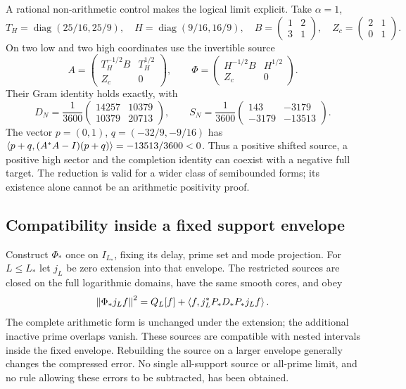 A rational non-arithmetic control makes the logical limit explicit.
Take $\alpha=1$,
\[
T_H=\operatorname{diag}(25/16,25/9),\quad
H=\operatorname{diag}(9/16,16/9),\quad
B=\begin{pmatrix}1&2\\3&1\end{pmatrix},\quad
Z_c=\begin{pmatrix}2&1\\0&1\end{pmatrix}.
\]
On two low and two high coordinates use the invertible source
\[
A=\begin{pmatrix}T_H^{-1/2}B&T_H^{1/2}\\Z_c&0\end{pmatrix},
\qquad
\Phi=\begin{pmatrix}H^{-1/2}B&H^{1/2}\\Z_c&0\end{pmatrix}.
\]
Their Gram identity holds exactly, with
\[
D_N=\frac1{3600}
\begin{pmatrix}14257&10379\\10379&20713\end{pmatrix},\qquad
S_N=\frac1{3600}
\begin{pmatrix}143&-3179\\-3179&-13513\end{pmatrix}.
\]
The vector $p=(0,1)$, $q=(-32/9,-9/16)$ has
$\left\langle p+q,(A^*A-I)(p+q)\right\rangle=-13513/3600<0$.
Thus a positive shifted source, a positive high sector and the
completion identity can coexist with a negative full target.
The reduction is valid for a wider class of semibounded forms;
its existence alone cannot be an arithmetic positivity proof.

\subsection{Compatibility inside a fixed support envelope}
Construct $\Phi_*$ once on $I_{L_*}$, fixing its delay, prime set
and mode projection. For $L\le L_*$ let $j_L$ be zero extension
into that envelope. The restricted sources are closed on the
full logarithmic domains, have the same smooth cores, and obey
\begin{equation}\label{joint:envelope}
\left\lVert\Phi_*j_Lf\right\rVert^2
=Q_L[f]+\left\langle f,j_L^*P_*D_*P_*j_Lf\right\rangle.
\end{equation}
The complete arithmetic form is unchanged under the extension;
the additional inactive prime overlaps vanish. These sources
are compatible with nested intervals inside the fixed envelope.
Rebuilding the source on a larger envelope generally changes
the compressed error. No single all-support source or all-prime
limit, and no rule allowing these errors to be subtracted, has
been obtained.

